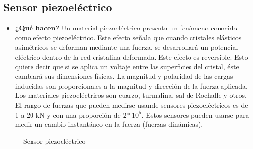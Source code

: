 \begin{figure}[h]
	\centering
\end{figure}



	\subsection*{Sensor piezoeléctrico}
\begin{itemize}
	\item \textbf{¿Qué hacen?} 
	Un material piezoeléctrico presenta un fenómeno conocido como efecto piezoeléctrico. Este efecto señala que cuando cristales elásticos asimétricos se deforman mediante una fuerza, se desarrollará un potencial eléctrico dentro de la red cristalina deformada. Este efecto es reversible. Esto quiere decir que si se aplica un voltaje entre las superficies del cristal, éste cambiará sus dimensiones físicas. La magnitud y polaridad de las cargas inducidas son proporcionales a la magnitud y dirección de la fuerza aplicada. Los materiales piezoeléctricos son cuarzo, turmalina, sal de Rochalle y otros. El rango de fuerzas que pueden medirse usando sensores piezoeléctricos es de 1 a 20 kN y con una proporción de $2*10^{5}.$ 
	Estos sensores pueden usarse para medir un cambio instantáneo en la fuerza (fuerzas dinámicas). \cite{IngMecafenix_SensorPiezoelectrico}
	
\end{itemize}

\begin{figure}[h]
	\centering
	\hfill
	\caption{Sensor piezoeléctrico}
	\label{fig:mascotas}
\end{figure}

\vspace{15cm}